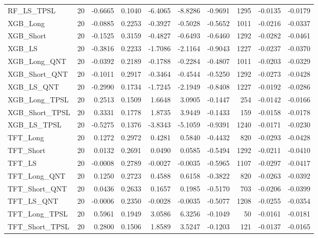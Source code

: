 \begin{tabular}{llrrrrrrrr}
\cline{1-10}
RF\_LS\_TPSL & 20 & -0.6665 & 0.1040 & -6.4065 & -8.8286 & -0.9691 & 1295 & -0.0135 & -0.0179 \\
\cline{1-10}
XGB\_Long & 20 & -0.0885 & 0.2253 & -0.3927 & -0.5028 & -0.5652 & 1011 & -0.0216 & -0.0337 \\
\cline{1-10}
XGB\_Short & 20 & -0.1525 & 0.3159 & -0.4827 & -0.6493 & -0.6460 & 1292 & -0.0282 & -0.0461 \\
\cline{1-10}
XGB\_LS & 20 & -0.3816 & 0.2233 & -1.7086 & -2.1164 & -0.9043 & 1227 & -0.0237 & -0.0370 \\
\cline{1-10}
XGB\_Long\_QNT & 20 & -0.0392 & 0.2189 & -0.1788 & -0.2284 & -0.4807 & 1011 & -0.0203 & -0.0329 \\
\cline{1-10}
XGB\_Short\_QNT & 20 & -0.1011 & 0.2917 & -0.3464 & -0.4544 & -0.5250 & 1292 & -0.0273 & -0.0428 \\
\cline{1-10}
XGB\_LS\_QNT & 20 & -0.2990 & 0.1734 & -1.7245 & -2.1949 & -0.8408 & 1227 & -0.0192 & -0.0286 \\
\cline{1-10}
XGB\_Long\_TPSL & 20 & 0.2513 & 0.1509 & 1.6648 & 3.0905 & -0.1447 & 254 & -0.0142 & -0.0166 \\
\cline{1-10}
XGB\_Short\_TPSL & 20 & 0.3331 & 0.1778 & 1.8735 & 3.9449 & -0.1433 & 159 & -0.0158 & -0.0178 \\
\cline{1-10}
XGB\_LS\_TPSL & 20 & -0.5275 & 0.1376 & -3.8343 & -5.1059 & -0.9391 & 1240 & -0.0171 & -0.0230 \\
\cline{1-10}
TFT\_Long & 20 & 0.1272 & 0.2972 & 0.4281 & 0.5840 & -0.4432 & 820 & -0.0293 & -0.0428 \\
\cline{1-10}
TFT\_Short & 20 & 0.0132 & 0.2691 & 0.0490 & 0.0585 & -0.5494 & 1292 & -0.0211 & -0.0410 \\
\cline{1-10}
TFT\_LS & 20 & -0.0008 & 0.2789 & -0.0027 & -0.0035 & -0.5965 & 1107 & -0.0297 & -0.0417 \\
\cline{1-10}
TFT\_Long\_QNT & 20 & 0.1250 & 0.2723 & 0.4588 & 0.6158 & -0.3822 & 820 & -0.0263 & -0.0392 \\
\cline{1-10}
TFT\_Short\_QNT & 20 & 0.0436 & 0.2633 & 0.1657 & 0.1985 & -0.5170 & 703 & -0.0206 & -0.0399 \\
\cline{1-10}
TFT\_LS\_QNT & 20 & -0.0006 & 0.2350 & -0.0028 & -0.0035 & -0.5077 & 1208 & -0.0255 & -0.0354 \\
\cline{1-10}
TFT\_Long\_TPSL & 20 & 0.5961 & 0.1949 & 3.0586 & 6.3256 & -0.1049 & 50 & -0.0161 & -0.0181 \\
\cline{1-10}
TFT\_Short\_TPSL & 20 & 0.2800 & 0.1506 & 1.8589 & 3.5247 & -0.1203 & 121 & -0.0137 & -0.0165 \\

\end{tabular}
